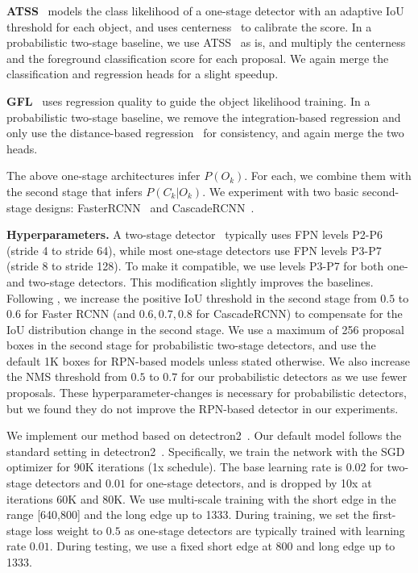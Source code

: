\documentclass{article}
\renewcommand{\paragraph}[1]{\noindent\textbf{#1}}
\begin{document}
\textbf{ATSS}~\cite{zhang2020bridging} models the class likelihood of a one-stage detector with an adaptive IoU threshold for each object, and uses centerness~\cite{tian2019fcos} to calibrate the score.
In a probabilistic two-stage baseline, we use ATSS~\cite{zhang2020bridging} as is, and multiply the centerness and the foreground classification score for each proposal.
We again merge the classification and regression heads for a slight speedup.

\textbf{GFL}~\cite{li2020generalized} uses regression quality to guide the object likelihood training.
In a probabilistic two-stage baseline, we remove the integration-based regression and only use the distance-based regression~\cite{tian2019fcos} for consistency, and again merge the two heads.

The above one-stage architectures infer $P(O_k)$.
For each, we combine them with the second stage that infers $P(C_k |O_k)$.
We experiment with two basic second-stage designs: FasterRCNN~\cite{ren2015faster} and CascadeRCNN~\cite{cai2018cascade}.



\paragraph{Hyperparameters.}
A two-stage detector~\cite{ren2015faster} typically uses FPN levels P2-P6 (stride 4 to stride 64), while most one-stage detectors use FPN levels P3-P7 (stride 8 to stride 128).
To make it compatible, we use levels P3-P7 for both one- and two-stage detectors.
This modification slightly improves the baselines.
Following \citet{wang2019region}, we increase the positive IoU threshold in the second stage from $0.5$ to $0.6$ for Faster RCNN (and $0.6, 0.7, 0.8$ for CascadeRCNN)
to compensate for the IoU distribution change in the second stage.
We use a maximum of 256 proposal boxes in the second stage for probabilistic two-stage detectors, and use the default 1K boxes for RPN-based models unless stated otherwise.
We also increase the NMS threshold from $0.5$ to $0.7$ for our probabilistic detectors as we use fewer proposals.
These hyperparameter-changes is necessary for probabilistic detectors, but we found they do not improve the RPN-based detector in our experiments. 


We implement our method based on detectron2~\cite{wu2019detectron2}.
Our default model follows the standard setting in detectron2~\cite{wu2019detectron2}.
Specifically, we train the network with the SGD optimizer for 90K iterations (1x schedule).
The base learning rate is $0.02$ for two-stage detectors and $0.01$ for one-stage detectors, 
and is dropped by 10x at iterations 60K and 80K.
We use multi-scale training with the short edge in the range [640,800] and the long edge up to 1333.
During training, we set the first-stage loss weight to $0.5$ as one-stage detectors are typically trained with learning rate $0.01$.
During testing, we use a fixed short edge at 800 and long edge up to 1333.
\end{document}
